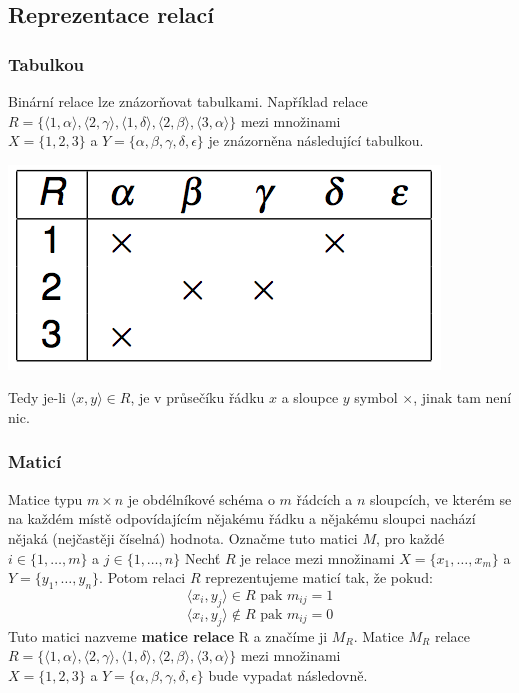 \documentclass[12pt,a4paper]{article}
\begin{document}
\subsection{Reprezentace relací}

\subsubsection{Tabulkou}
Binární relace lze znázorňovat tabulkami. Například relace \\$R = \{ \langle 1, \alpha \rangle, \langle 2, \gamma \rangle, \langle 1, \delta \rangle, \langle 2, \beta \rangle, \langle 3, \alpha \rangle\}$ mezi množinami \\$X = \{1,2,3\}$ a $Y = \{\alpha, \beta, \gamma, \delta, \epsilon\}$ je znázorněna následující tabulkou.

\begin{center}
	\includegraphics[scale=0.5]{img/RelationTable}
\end{center}

Tedy je-li $\langle x, y \rangle \in R$, je v průsečíku řádku $x$ a sloupce $y$ symbol $\times$, jinak tam není nic.

\subsubsection{Maticí}
Matice typu $m \times n$ je obdélníkové schéma o $m$ řádcích a $n$ sloupcích, ve kterém se na každém místě odpovídajícím nějakému řádku a nějakému sloupci nachází nějaká (nejčastěji číselná) hodnota. Označme tuto matici $M$, pro každé $i \in \{1, \dots,m\}$ a $j \in \{1,\dots,n\}$  Nechť $R$ je relace mezi množinami $X = \{x_1,\dots,x_m\}$ a $Y = \{y_1, \dots, y_n\}$. Potom relaci $R$ reprezentujeme maticí tak, že pokud:
$$\langle x_i,y_j\rangle \in R \text{ pak } m_{ij} = 1$$
$$\langle x_i,y_j\rangle \not\in R \text{ pak } m_{ij} = 0$$
Tuto matici nazveme \textbf{matice relace} R a značíme ji $M_R$. Matice $M_R$ relace $R = \{ \langle 1, \alpha \rangle, \langle 2, \gamma \rangle, \langle 1, \delta \rangle, \langle 2, \beta \rangle, \langle 3, \alpha \rangle\}$ mezi množinami \\$X = \{1,2,3\}$ a $Y = \{\alpha, \beta, \gamma, \delta, \epsilon\}$ bude vypadat  následovně.
\end{document}
